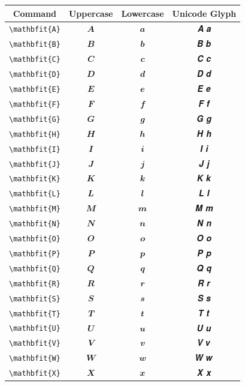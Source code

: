 \documentclass[12pt,a4paper]{article}
\begin{document}
\begin{longtable}{|c|c|c|c|}
\hline
\textbf{Command} & \textbf{Uppercase} & \textbf{Lowercase} & \textbf{Unicode Glyph} \\
\hline
\verb|\mathbfit{A}| & $\mathbfit{A}$ & $\mathbfit{a}$ & 𝑨 𝒂 \\
\verb|\mathbfit{B}| & $\mathbfit{B}$ & $\mathbfit{b}$ & 𝑩 𝒃 \\
\verb|\mathbfit{C}| & $\mathbfit{C}$ & $\mathbfit{c}$ & 𝑪 𝒄 \\
\verb|\mathbfit{D}| & $\mathbfit{D}$ & $\mathbfit{d}$ & 𝑫 𝒅 \\
\verb|\mathbfit{E}| & $\mathbfit{E}$ & $\mathbfit{e}$ & 𝑬 𝒆 \\
\verb|\mathbfit{F}| & $\mathbfit{F}$ & $\mathbfit{f}$ & 𝑭 𝒇 \\
\verb|\mathbfit{G}| & $\mathbfit{G}$ & $\mathbfit{g}$ & 𝑮 𝒈 \\
\verb|\mathbfit{H}| & $\mathbfit{H}$ & $\mathbfit{h}$ & 𝑯 𝒉 \\
\verb|\mathbfit{I}| & $\mathbfit{I}$ & $\mathbfit{i}$ & 𝑰 𝒊 \\
\verb|\mathbfit{J}| & $\mathbfit{J}$ & $\mathbfit{j}$ & 𝑱 𝒋 \\
\verb|\mathbfit{K}| & $\mathbfit{K}$ & $\mathbfit{k}$ & 𝑲 𝒌 \\
\verb|\mathbfit{L}| & $\mathbfit{L}$ & $\mathbfit{l}$ & 𝑳 𝒍 \\
\verb|\mathbfit{M}| & $\mathbfit{M}$ & $\mathbfit{m}$ & 𝑴 𝒎 \\
\verb|\mathbfit{N}| & $\mathbfit{N}$ & $\mathbfit{n}$ & 𝑵 𝒏 \\
\verb|\mathbfit{O}| & $\mathbfit{O}$ & $\mathbfit{o}$ & 𝑶 𝒐 \\
\verb|\mathbfit{P}| & $\mathbfit{P}$ & $\mathbfit{p}$ & 𝑷 𝒑 \\
\verb|\mathbfit{Q}| & $\mathbfit{Q}$ & $\mathbfit{q}$ & 𝑸 𝒒 \\
\verb|\mathbfit{R}| & $\mathbfit{R}$ & $\mathbfit{r}$ & 𝑹 𝒓 \\
\verb|\mathbfit{S}| & $\mathbfit{S}$ & $\mathbfit{s}$ & 𝑺 𝒔 \\
\verb|\mathbfit{T}| & $\mathbfit{T}$ & $\mathbfit{t}$ & 𝑻 𝒕 \\
\verb|\mathbfit{U}| & $\mathbfit{U}$ & $\mathbfit{u}$ & 𝑼 𝒖 \\
\verb|\mathbfit{V}| & $\mathbfit{V}$ & $\mathbfit{v}$ & 𝑽 𝒗 \\
\verb|\mathbfit{W}| & $\mathbfit{W}$ & $\mathbfit{w}$ & 𝑾 𝒘 \\
\verb|\mathbfit{X}| & $\mathbfit{X}$ & $\mathbfit{x}$ & 𝑿 𝒙 \\

\end{longtable}
\end{document}
